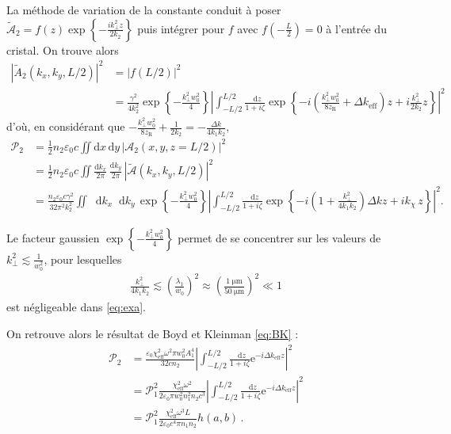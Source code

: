 \documentclass[11pt,a4paper]{article}
\newcommand{\diff}{\mathop{}\!\mathrm{d}}
\newcommand{\zr}{z_\mathsc{R}}
\newcommand{\chie}{\chi_\mathsc{eff}}
\newcommand{\dke}{\Delta k_\mathsc{eff}}
\renewcommand{\P}{\mathscr{P}}
\newcommand{\A}{\mathcal{A}}
\newcommand{\e}[1]{\text{e}^{#1}}
\newcommand{\mathsc}[1]{\mathrm{\scriptscriptstyle {#1}}}
\begin{document}
La méthode de variation de la constante conduit à poser $\tilde{\A}_2 = f(z) \exp\left\{- \frac{i k_\bot^2 z}{2 k_2} \right\}$ puis intégrer pour $f$ avec $f(-\frac L 2) = 0$ à l'entrée du cristal. 
On trouve alors 
\begin{align}
\left| \tilde{A}_2(k_x,k_y,L/2) \right|^2 &= \left| f(L/2) \right|^2  \\
&= \frac{\gamma^2}{4k_2^2} \exp\left\lbrace -\frac{k_\bot^2 w_0^2}{4}\right\rbrace \left|\int_{-L/2}^{L/2} \frac{\diff z}{1+i\zeta} \exp\left\{ -i \left( \frac{k_\bot^2 w_0^2}{8\zr} + \dke \right) z + i \frac{ k_\bot^2 }{2 k_2} z \right\}  \right|^2
\end{align}
d'où, en considérant que $-\frac{k_\bot^2 w_0^2}{8\zr} + \frac{1}{2k_2} = - \frac{\Delta k}{4k_1k_2}$,
\begin{align}
\P_2 &= \frac12 n_2 \varepsilon_0 c \iint \mathrm dx \, \mathrm dy \, |\A_2(x,y,z=L/2)|^2 \\
&= \frac12 n_2 \varepsilon_0 c \iint \frac{\mathrm dk_x}{2\pi} \, \frac{\mathrm d k_y}{2\pi} \, |\tilde{\A}(k_x,k_y,L/2)|^2 \\
&= \frac{n_2\varepsilon_0c \gamma^2}{32\pi^2k_2^2} \iint \diff k_x \diff k_y \, \exp\left\lbrace -\frac{k_\bot^2 w_0^2}{4}\right\rbrace \left|\int_{-L/2}^{L/2} \frac{\diff z}{1+i\zeta} \exp\left\{ -i \left( 1 + \frac{k_\bot^2}{4k_1k_2} \right) \Delta k z + i k_\chi\, z \right\} \right|^2 .
\label{eq:exa}
\end{align}

Le facteur gaussien $\exp \left\{- \frac{k_\bot^2 w_0^2}{4}\right\}$ permet de se concentrer sur les valeurs de $k_\bot^2 \lesssim \frac{1}{w_0^2}$, pour lesquelles 
\begin{align}
\frac{k_\bot^2}{4 k_1 k_2} \lesssim \left(\frac{\lambda_1}{w_0}\right)^2 \approx \left(\frac{\SI{1}{\micro\meter}}{\SI{50}{\micro\meter}} \right)^2 \ll 1
\end{align}
est négligeable dans \eqref{eq:exa}.

On retrouve alors le résultat de Boyd et Kleinman \eqref{eq:BK} :
\begin{align}
\P_2 &= \frac{\varepsilon_0 \chie^2 \omega^2 \pi w_0^2 A_1^4}{32 c n_2} \left|\int_{-L/2}^{L/2} \frac{\diff z}{1+i\zeta} \e{ -i \dke z } \right|^2 \nonumber \\
&= \P_1^2 \frac{\chie^2 \omega^2}{2\varepsilon_0 \pi w_0^2 n_1^2n_2 c^3} \left|\int_{-L/2}^{L/2} \frac{\diff z}{1+i\zeta} \e{ -i \dke z } \right|^2 \nonumber \\
&= \P_1^2 \frac{\chie^2 \omega^3 L}{2 \varepsilon_0 c^4 \pi n_1 n_2} h(a,b) \,.
\end{align}
\end{document}
